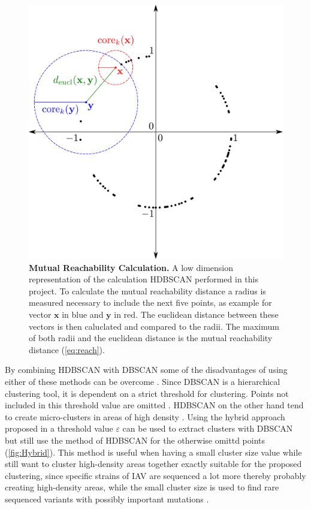 \begin{figure}[!hbt]
    \centering
    \includegraphics[width=\textwidth]{Graphics/HDB.pdf}
    \caption[Mutual Reachability Calculation]{\textbf{Mutual Reachability Calculation.} A low dimension representation of the calculation \gls{HDBSCAN} performed in this project. To calculate the mutual reachability distance a radius is measured necessary to include the next five points, as example for vector $\mathbf{x}$ in blue and $\mathbf{y}$ in red. The euclidean distance between these vectors is then caluclated and compared to the radii. The maximum of both radii and the euclidean distance is the mutual reachability distance (\autoref{eq:reach}).}
    \label{fig:HDB}
\end{figure}

By combining \gls{HDBSCAN} with \gls{DBSCAN} some of the disadvantages of using either of these methods can be overcome \autocite{mcinnes_hdbscan_2017, moulavi_density-based_2014}. Since \gls{DBSCAN} is a hierarchical clustering tool, it is dependent on a strict threshold for clustering. Points not included in this threshold value are omitted \autocite{ester_density-based_1996, schubert_dbscan_2017}. \gls{HDBSCAN} on the other hand tend to create micro-clusters in areas of high density \autocite{mcinnes_hdbscan_2017}. Using the hybrid approach proposed in \autocite{malzer_hybrid_2020} a threshold value $\varepsilon$ can be used to extract clusters with \gls{DBSCAN} but still use the method of \gls{HDBSCAN} for the otherwise omittd points (\autoref{fig:Hybrid}). This method is useful when having a small cluster size value while still want to cluster high-density areas together exactly suitable for the proposed clustering, since specific strains of \gls{IAV} are sequenced a lot more thereby probably creating high-density areas, while the small cluster size is used to find rare sequenced variants with possibly important mutations \autocite{malzer_hybrid_2020}.

